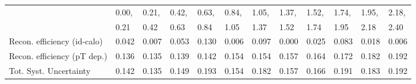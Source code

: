 \begin{tabular}{l|p{0.6cm}p{0.6cm}p{0.6cm}p{0.6cm}p{0.6cm}p{0.6cm}p{0.6cm}p{0.6cm}p{0.6cm}p{0.6cm}p{0.6cm}}
\hline
   & 0.00, & 0.21, & 0.42, & 0.63, & 0.84, & 1.05, & 1.37, & 1.52, & 1.74, & 1.95, & 2.18,  \\ 
   & 0.21 & 0.42 & 0.63 & 0.84 & 1.05 & 1.37 & 1.52 & 1.74 & 1.95 & 2.18 & 2.40  \\ 
\hline
Recon. efficiency (id-calo)              & 0.042 & 0.007 & 0.053 & 0.130 & 0.006 & 0.097 & 0.000 & 0.025 & 0.083 & 0.018 & 0.006 \\
\hline
Recon. efficiency (pT dep.)              & 0.136 & 0.135 & 0.139 & 0.142 & 0.154 & 0.154 & 0.157 & 0.164 & 0.172 & 0.182 & 0.192 \\
\hline
Tot. Syst. Uncertainty                   & 0.142 & 0.135 & 0.149 & 0.193 & 0.154 & 0.182 & 0.157 & 0.166 & 0.191 & 0.183 & 0.192 \\
\hline
\end{tabular}
